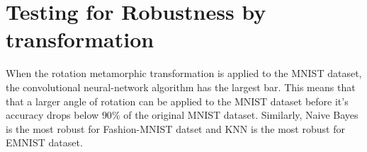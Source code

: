 \section{Testing for Robustness by transformation}
When the rotation metamorphic transformation is applied to the MNIST dataset, the convolutional neural-network algorithm has the largest bar. This means that that a larger angle of rotation can be applied to the MNIST dataset before it's accuracy drops below $90\%$ of the original MNIST dataset. Similarly, Naive Bayes is the most robust for Fashion-MNIST datset and KNN is the most robust for EMNIST dataset.

\mnistx
    
\mnisty

